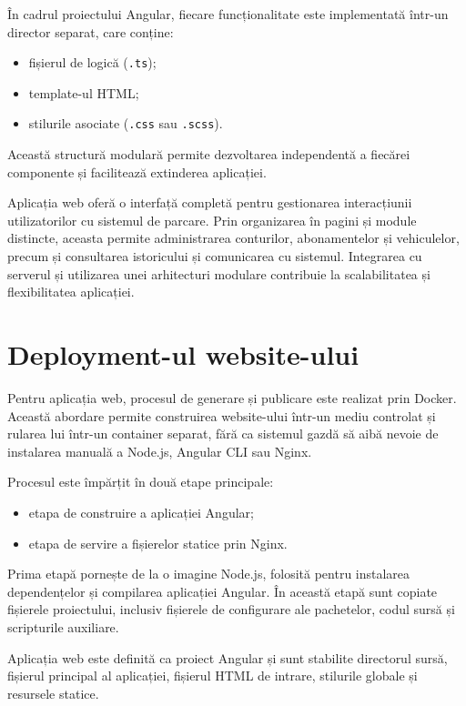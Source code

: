 În cadrul proiectului Angular, fiecare funcționalitate este implementată într-un director separat, care conține:
\begin{itemize}
    \item fișierul de logică (\texttt{.ts});
    \item template-ul HTML;
    \item stilurile asociate (\texttt{.css} sau \texttt{.scss}).
\end{itemize}

Această structură modulară permite dezvoltarea independentă a fiecărei componente și facilitează extinderea aplicației.

Aplicația web oferă o interfață completă pentru gestionarea interacțiunii utilizatorilor cu sistemul de parcare. Prin organizarea în pagini și module distincte, aceasta permite administrarea conturilor, abonamentelor și vehiculelor, precum și consultarea istoricului și comunicarea cu sistemul. Integrarea cu serverul și utilizarea unei arhitecturi modulare contribuie la scalabilitatea și flexibilitatea aplicației.

\section{Deployment-ul website-ului}

Pentru aplicația web, procesul de generare și publicare este realizat prin Docker. Această abordare permite construirea website-ului într-un mediu controlat și rularea lui într-un container separat, fără ca sistemul gazdă să aibă nevoie de instalarea manuală a Node.js, Angular CLI sau Nginx.

Procesul este împărțit în două etape principale:
\begin{itemize}
    \item etapa de construire a aplicației Angular;
    \item etapa de servire a fișierelor statice prin Nginx.
\end{itemize}

Prima etapă pornește de la o imagine Node.js, folosită pentru instalarea dependențelor și compilarea aplicației Angular. În această etapă sunt copiate fișierele proiectului, inclusiv fișierele de configurare ale pachetelor, codul sursă și scripturile auxiliare.

Aplicația web este definită ca proiect Angular și sunt stabilite directorul sursă, fișierul principal al aplicației, fișierul HTML de intrare, stilurile globale și resursele statice.

